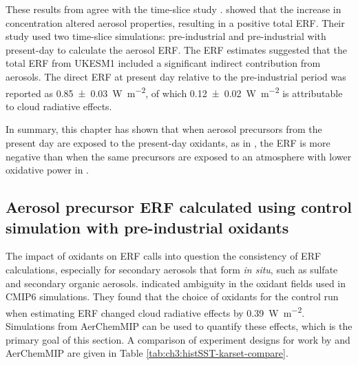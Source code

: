 These results from \sstpich{} agree with the time-slice study \citet{oconnorApportionmentPreIndustrial2022}. \citet{oconnorApportionmentPreIndustrial2022} showed that the increase in  concentration altered aerosol properties, resulting in a positive total  ERF. Their study used two time-slice simulations: pre-industrial and pre-industrial with present-day  to calculate the aerosol ERF. The ERF estimates suggested that the total  ERF from UKESM1 included a significant indirect contribution from aerosols. The direct  ERF at present day relative to the pre-industrial period was reported as \qty{0.85+-0.03}{\watt\per\metre\squared}, of which \qty{0.12+-0.02}{\watt\per\metre\squared} is attributable to cloud radiative effects.



In summary, this chapter has shown that when aerosol precursors from the present day are exposed to the present-day oxidants, as in \histsst{}, the ERF is more negative than when the same precursors are exposed to an atmosphere with lower oxidative power in \sstpio{}. 

\subsection{Aerosol precursor ERF calculated using control simulation with pre-industrial oxidants}

The impact of oxidants on ERF calls into question the consistency of ERF calculations, especially for secondary aerosols that form \textit{in situ}, such as sulfate and secondary organic aerosols. \citep{karsetStrongImpactsAerosol2018} indicated ambiguity in the oxidant fields used in CMIP6 simulations. They found that the choice of oxidants for the control run when estimating ERF changed cloud radiative effects by \qty{0.39}{\watt\per\metre\squared}. Simulations from AerChemMIP can be used to quantify these effects, which is the primary goal of this section. A comparison of experiment designs for work by \citet{karsetStrongImpactsAerosol2018} and AerChemMIP are given in Table \ref{tab:ch3:histSST-karset-compare}.

